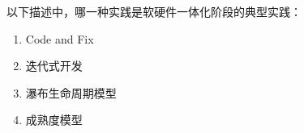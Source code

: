 \begin{problem}
	以下描述中，哪一种实践是软硬件一体化阶段的典型实践：
    \vspace{-0.8em}
    \begin{multicols}{4}
        \begin{enumerate}[label=\Alph*.]
            \item Code and Fix
            \item 迭代式开发
            \item 瀑布生命周期模型
            \item 成熟度模型
        \end{enumerate}
    \end{multicols}
    \vspace{-1em}
\end{problem}

